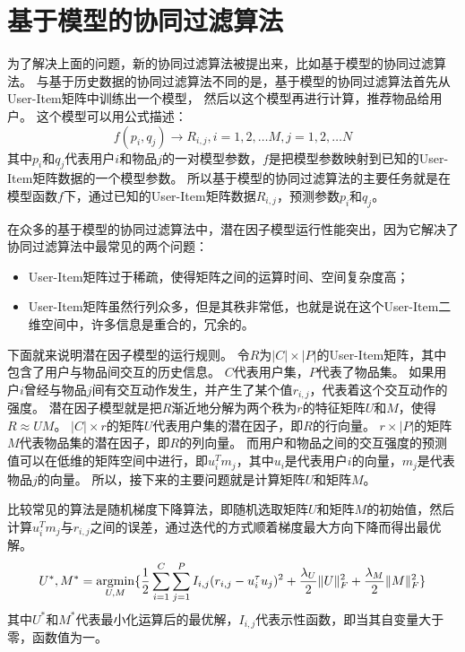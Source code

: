 \section{基于模型的协同过滤算法}
为了解决上面的问题，新的协同过滤算法被提出来，比如基于模型的协同过滤算法。
与基于历史数据的协同过滤算法不同的是，基于模型的协同过滤算法首先从User-Item矩阵中训练出一个模型，
然后以这个模型再进行计算，推荐物品给用户。
这个模型可以用公式描述：
\begin{equation}
f(p_i,q_j)\rightarrow R_{i,j},i=1,2,\dots M, j=1,2,\dots N
\end{equation}
其中$p_i$和$q_j$代表用户$i$和物品$j$的一对模型参数，$f$是把模型参数映射到已知的User-Item矩阵数据的一个模型参数。
所以基于模型的协同过滤算法的主要任务就是在模型函数$f$下，通过已知的User-Item矩阵数据$R_{i,j}$，预测参数$p_i$和$q_j$。

在众多的基于模型的协同过滤算法中，潜在因子模型运行性能突出，因为它解决了协同过滤算法中最常见的两个问题：
\begin{itemize}
\item User-Item矩阵过于稀疏，使得矩阵之间的运算时间、空间复杂度高；
\item User-Item矩阵虽然行列众多，但是其秩非常低，也就是说在这个User-Item二维空间中，许多信息是重合的，冗余的。
\end{itemize}

下面就来说明潜在因子模型的运行规则。
令$R$为$|C|\times|P|$的User-Item矩阵，其中包含了用户与物品间交互的历史信息。
$C$代表用户集，$P$代表了物品集。
如果用户$i$曾经与物品$j$间有交互动作发生，并产生了某个值$r_{i,j}$，代表着这个交互动作的强度。
潜在因子模型就是把$R$渐近地分解为两个秩为$r$的特征矩阵$U$和$M$，使得$R\approx UM$。
$|C|\times r$的矩阵$U$代表用户集的潜在因子，即$R$的行向量。
$r\times |P|$的矩阵$M$代表物品集的潜在因子，即$R$的列向量。
而用户和物品之间的交互强度的预测值可以在低维的矩阵空间中进行，即$u_i^Tm_j$，其中$u_i$是代表用户$i$的向量，$m_j$是代表物品$j$的向量。
所以，接下来的主要问题就是计算矩阵$U$和矩阵$M$。

比较常见的算法是随机梯度下降算法，即随机选取矩阵$U$和矩阵$M$的初始值，然后计算$u_i^Tm_j$与$r_{i,j}$之间的误差，通过迭代的方式顺着梯度最大方向下降而得出最优解。
\begin{equation}
U^*,M^* = \mathop{\operatorname*{argmin}}_{U,M} \{\frac{1}{2} \sum_{i=1}^C \sum_{j=1}^P I_{i,j}(r_{i,j}-u_i^{\tau} u_j)^2 + \frac{\lambda_U}{2}\lVert U\rVert_F^2 +\frac{\lambda_M}{2}\lVert M\rVert_F^2\}
\end{equation}
其中$U^*$和$M^*$代表最小化运算后的最优解，$I_{i,j}$代表示性函数，即当其自变量大于零，函数值为一。

